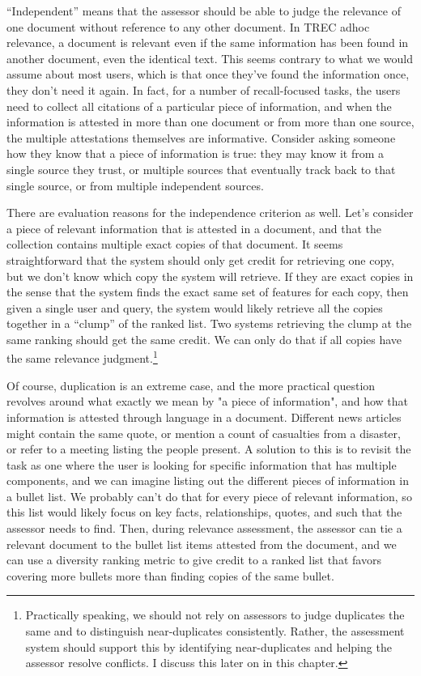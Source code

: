 \documentclass[nobib]{tufte-book}
\begin{document}
``Independent'' means that the assessor should be able to judge the relevance of one document without reference to any other document.  In TREC adhoc relevance, a document is relevant even if the same information has been found in another document, even the identical text.  This seems contrary to what we would assume about most users, which is that once they've found the information once, they don't need it again.  In fact, for a number of recall-focused tasks, the users need to collect all citations of a particular piece of information, and when the information is attested in more than one document or from more than one source, the multiple attestations themselves are informative.  Consider asking someone how they know that a piece of information is true: they may know it from a single source they trust, or multiple sources that eventually track back to that single source, or from multiple independent sources.

There are evaluation reasons for the independence criterion as well.  Let's consider a piece of relevant information that is attested in a document, and that the collection contains multiple exact copies of that document.  It seems straightforward that the system should only get credit for retrieving one copy, but we don't know which copy the system will retrieve.  If they are exact copies in the sense that the system finds the exact same set of features for each copy, then given a single user and query, the system would likely retrieve all the copies together in a ``clump'' of the ranked list.  Two systems retrieving the clump at the same ranking should get the same credit.  We can only do that if all copies have the same relevance judgment.\footnote{Practically speaking, we should not rely on assessors to judge duplicates the same and to distinguish near-duplicates consistently.  Rather, the assessment system should support this by identifying near-duplicates and helping the assessor resolve conflicts.  I discuss this later on in this chapter.}

Of course, duplication is an extreme case, and the more practical question revolves around what exactly we mean by "a piece of information", and how that information is attested through language in a document.  Different news articles might contain the same quote, or mention a count of casualties from a disaster, or refer to a meeting listing the people present.  A solution to this is to revisit the task as one where the user is looking for specific information that has multiple components, and we can imagine listing out the different pieces of information in a bullet list.  We probably can't do that for every piece of relevant information, so this list would likely focus on key facts, relationships, quotes, and such that the assessor needs to find.  Then, during relevance assessment, the assessor can tie a relevant document to the bullet list items attested from the document, and we can use a diversity ranking metric to give credit to a ranked list that favors covering more bullets more than finding copies of the same bullet.
\end{document}
